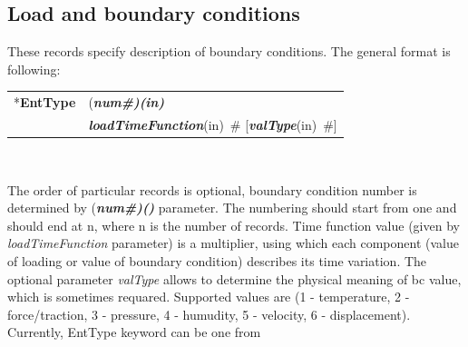 \documentclass[a4paper]{article}
\makeatletter
\newcommand{\param}[1]{{\em #1}}
\newcommand{\fieldVal}[2]{\mbox{({\it\bf{#1}\#)\tiny (#2)}}}
\newcommand{\keywordnotype}[1]{\mbox{{\it{\bf{#1}}}}}
\newcommand{\keyword}[2]{\mbox{{\keywordnotype{#1}\tiny (#2)}}}
\newcommand{\entKeyword}[1]{\mbox{{*{\bf{#1}}}}}
\newcommand{\field}[2]{\mbox{\keyword{#1}{#2}~\#}}
\newcommand{\optField}[2]{\mbox{[\field{#1}{#2}]}}
\newenvironment{record}[1][]{\begin{tabular}{|ll}}{\end{tabular}\\}
\newcommand{\recentry}[2]{{#1}&{#2}\\}
\newcounter{rcc}
\newenvironment{record}[1][\textwidth]{\setcounter{rcc}{0}\begin{tabular*}{#1}{|ll@{\extracolsep{\fill}}r}}{\end{tabular*}\\}
\newcommand{\recentry}[2]{\ifthenelse{\value{rcc}>0}{&$\backslash$ \\}{\setcounter{rcc}{1}}{#1}&{#2}}
\makeatother
\begin{document}
\subsection{Load and boundary conditions}
\label{_LoadBoundaryInitialConditions}
These records specify description of  boundary conditions. The general format is
following:

\noindent
\begin{record}
  \recentry{\entKeyword{EntType}}{\fieldVal{num}{in}}
  \recentry{}{\field{loadTimeFunction}{in} \optField{valType}{in}}
\end{record}

The order of particular  records is optional, boundary condition number is determined by \fieldVal{num}{} parameter.
The numbering should start from one and should end at n, where n is the number of records.
Time function value (given by \param{loadTimeFunction} parameter) is a multiplier, using which
each  component (value of loading or value of boundary condition)
describes its time variation.
The optional parameter \param{valType} allows to determine the
physical meaning of bc value, which is sometimes requared. Supported
values are (1 - temperature, 2 - force/traction,
3 - pressure, 4 - humudity, 5 - velocity, 6 - displacement).
Currently, EntType keyword can be one from
\end{document}
